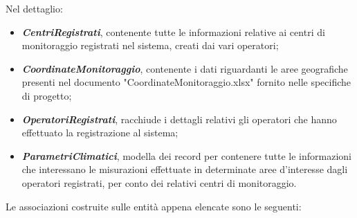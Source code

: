 Nel dettaglio:
\begin{itemize}
	\item \textbf{\textit{CentriRegistrati}}, contenente tutte le informazioni relative ai centri di monitoraggio registrati nel sistema, creati dai vari operatori;
	\item \textbf{\textit{CoordinateMonitoraggio}}, contenente i dati riguardanti le aree geografiche presenti nel documento "CoordinateMonitoraggio.xlsx" fornito nelle specifiche di progetto;
	\item \textbf{\textit{OperatoriRegistrati}}, racchiude i dettagli relativi gli operatori che hanno effettuato la registrazione al sistema;
	\item \textbf{\textit{ParametriClimatici}}, modella dei record per contenere tutte le informazioni che interessano le misurazioni effettuate in determinate aree d'interesse dagli operatori registrati, per conto dei relativi centri di monitoraggio.
\end{itemize}
\pagebreak
Le associazioni costruite sulle entità appena elencate sono le seguenti:

